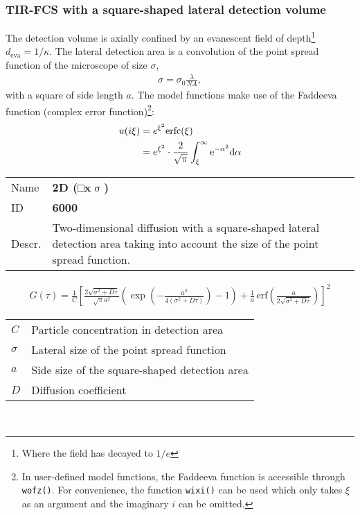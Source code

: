 \subsubsection{TIR-FCS with a square-shaped lateral detection volume}
The detection volume is axially confined by an evanescent field of depth\footnote{Where the field has decayed to $1/e$} $d_\mathrm{eva} = 1 / \kappa$.
The lateral detection area is a convolution of the point spread function of the microscope of size $\sigma$,
\begin{align}
\sigma = \sigma_0  \frac{\lambda}{\mathit{NA}},
\end{align} 
with a square of side length $a$.
The model functions make use of the Faddeeva function (complex error function)\footnote{In user-defined model functions, the Faddeeva function is accessible through \texttt{wofz()}. For convenience, the function \texttt{wixi()} can be used which only takes $\xi$ as an argument and the imaginary $i$ can be omitted.}:
\begin{align}
w\!(i\xi) &= e^{\xi^2} \mathrm{erfc}(\xi) \\
\notag &= e^{\xi^2} \cdot  \frac{2}{\sqrt{\pi}} \int_\xi^\infty \mathrm{e}^{-\alpha^2} \mathrm{d\alpha} \label{eq:faddeeva}
\end{align} 
\vspace{2em}


\noindent \begin{tabular}{lp{}}
Name & \textbf{2D (□x$\upsigma$)} \\ 
ID & \textbf{6000} \\ 
Descr. &  Two-dimensional diffusion with a square-shaped lateral detection area taking into account the size of the point spread function. \\ 
\end{tabular}
\begin{align}
G(\tau) = \frac{1}{C} \left[
\frac{2 \sqrt{\sigma^2+D \tau}}{\sqrt{\pi} a^2}
\left( \exp\left(-\frac{a^2}{4(\sigma^2+D \tau)}\right) - 1 \right) +
\frac{1}{a} \, \mathrm{erf}\left(\frac{a}{2 \sqrt{\sigma^2+D \tau}}\right)
\right]^2
\end{align} 
\begin{center}
\begin{tabular}{ll}
$C$ & Particle concentration in detection area \\ 
$\sigma$ & Lateral size of the point spread function \\ 
$a$ & Side size of the square-shaped detection area \\
$D$ & Diffusion coefficient \\
\end{tabular} \\
\end{center}
\vspace{2em}


